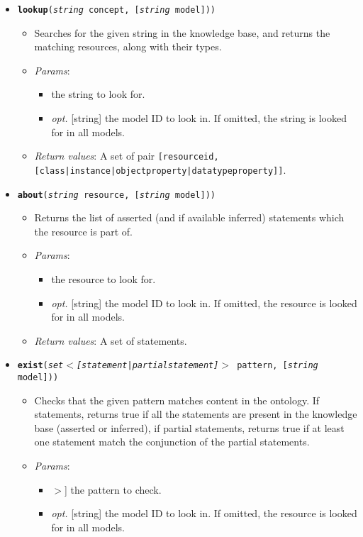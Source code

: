 \begin{itemize}
\item  \texttt{\textbf{lookup}(\emph{string} concept, [\emph{string} model]))}
\begin{itemize}
\item  Searches for the given string in the knowledge base, and returns the matching resources, along with their types.
\item  \emph{Params}:
\begin{itemize}
\item  [string] the string to look for.
\item  \emph{opt.} [string] the model ID to look in. If omitted, the string is looked for in all models. 
\end{itemize}

\item  \emph{Return values}: A set of pair \texttt{[resource{\textunderscore}id, [class|instance|object{\textunderscore}property|datatype{\textunderscore}property]]}.
\end{itemize}

\item  \texttt{\textbf{about}(\emph{string} resource, [\emph{string} model]))}
\begin{itemize}
\item  Returns the list of asserted (and if available inferred) statements which the resource is part of.
\item  \emph{Params}:
\begin{itemize}
\item  [string] the resource to look for.
\item  \emph{opt.} [string] the model ID to look in. If omitted, the resource is looked for in all models. 
\end{itemize}

\item  \emph{Return values}: A set of statements.
\end{itemize}

\item  \texttt{\textbf{exist}(\emph{set$<$[statement|partial{\textunderscore}statement]$>$} pattern, [\emph{string} model]))}
\begin{itemize}
\item  Checks that the given pattern matches content in the ontology. If statements, returns true if all the statements are present in the knowledge base (asserted or inferred), if partial statements, returns true if at least one statement match the conjunction of the partial statements.
\item  \emph{Params}:
\begin{itemize}
\item  [set$<$[statement|partial{\textunderscore}statement]$>$] the pattern to check.
\item  \emph{opt.} [string] the model ID to look in. If omitted, the resource is looked for in all models. 
\end{itemize}


\end{itemize}
\end{itemize}
